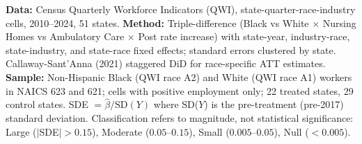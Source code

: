 \begin{table}[t]
\begin{threeparttable}
\begin{minipage}{\textwidth}
\textbf{Data:} Census Quarterly Workforce Indicators (QWI), state-quarter-race-industry cells, 2010--2024, 51 states.
\textbf{Method:} Triple-difference (Black vs White $\times$ Nursing Homes vs Ambulatory Care $\times$ Post rate increase) with state-year, industry-race, state-industry, and state-race fixed effects; standard errors clustered by state. Callaway-Sant'Anna (2021) staggered DiD for race-specific ATT estimates.
\textbf{Sample:} Non-Hispanic Black (QWI race A2) and White (QWI race A1) workers in NAICS 623 and 621; cells with positive employment only; 22 treated states, 29 control states.
SDE $= \hat{\beta} / \text{SD}(Y)$ where SD($Y$) is the pre-treatment (pre-2017) standard deviation.
Classification refers to magnitude, not statistical significance: Large ($|$SDE$| > 0.15$), Moderate ($0.05$--$0.15$), Small ($0.005$--$0.05$), Null ($< 0.005$).
\end{minipage}
\end{threeparttable}
\end{table}

